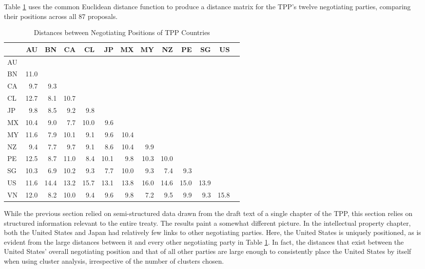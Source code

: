 \documentclass[12pt]{article}
\begin{document}
Table \ref{tbl_tpp_dist} uses the common Euclidean distance function 
to produce a distance matrix for the TPP's twelve negotiating parties, comparing their positions across all 
87 proposals.

\begin{table}[ht]
\centering
\caption{Distances between Negotiating Positions of TPP Countries}
\label{tbl_tpp_dist}
\begin{tabular}{lrrrrrrrrrrrr}
  \hline
 & AU & BN & CA & CL & JP & MX & MY & NZ & PE & SG & US \\ 
  \hline
AU &  &  &  &  &  &  &  &  &  &  &  &  \\ 
  BN & 11.0 &  &  &  &  &  &  &  &  &  &  &  \\ 
  CA & 9.7 & 9.3 &  &  &  &  &  &  &  &  &  &  \\ 
  CL & 12.7 & 8.1 & 10.7 &  &  &  &  &  &  &  &  &  \\ 
  JP & 9.8 & 8.5 & 9.2 & 9.8 &  &  &  &  &  &  &  &  \\ 
  MX & 10.4 & 9.0 & 7.7 & 10.0 & 9.6 &  &  &  &  &  &  &  \\ 
  MY & 11.6 & 7.9 & 10.1 & 9.1 & 9.6 & 10.4 &  &  &  &  &  &  \\ 
  NZ & 9.4 & 7.7 & 9.7 & 9.1 & 8.6 & 10.4 & 9.9 &  &  &  &  &  \\ 
  PE & 12.5 & 8.7 & 11.0 & 8.4 & 10.1 & 9.8 & 10.3 & 10.0 &  &  &  &  \\ 
  SG & 10.3 & 6.9 & 10.2 & 9.3 & 7.7 & 10.0 & 9.3 & 7.4 & 9.3 &  &  &  \\ 
  US & 11.6 & 14.4 & 13.2 & 15.7 & 13.1 & 13.8 & 16.0 & 14.6 & 15.0 & 13.9 &  &  \\ 
  VN & 12.0 & 8.2 & 10.0 & 9.4 & 9.6 & 9.8 & 7.2 & 9.5 & 9.9 & 9.3 & 15.8 &  \\ 
\hline
\end{tabular}
\end{table}

While the previous section relied on semi-structured data 
drawn from the draft text of a single chapter of the TPP, this section relies on structured information 
relevant to the entire treaty. The results paint a somewhat different picture. In the intellectual 
property chapter, both the United States and Japan had relatively few links to other negotiating 
parties. Here, the United States is uniquely positioned, as is evident from the large distances 
between it and every other negotiating party in Table \ref{tbl_tpp_dist}. 
In fact, the distances that exist between the United States' overall negotiating position 
and that of all other parties are large enough to consistently place the United States by itself when 
using cluster analysis, irrespective of the number of clusters chosen.
\end{document}
